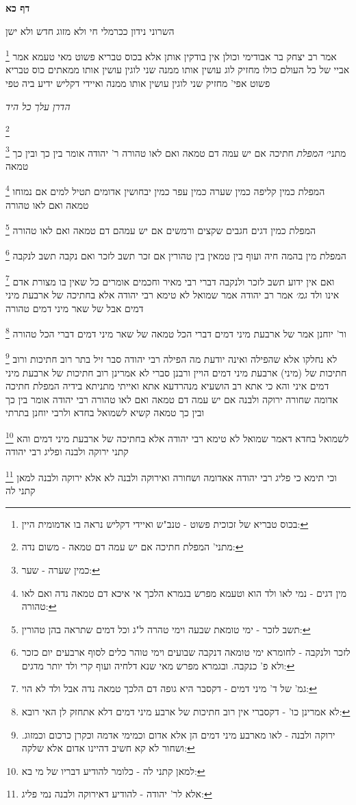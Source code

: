 \documentclass[12pt, openany]{book}
\newcommand{\sethebfont}{
\fontsize{10.5pt}{21.0pt} \selectfont
}
\newcommand{\twocol}[1]{
	{\sethebfont \begin{multicols}{2}
			#1
	\end{multicols}}	
}
\newcommand{\sectname}{}
\newcommand{\newsection}[1]{
	\addcontentsline{toc}{section}{#1}
	\renewcommand{\sectname}{#1}	
	\vspace{-\baselineskip}
	\begin{center}
		\textbf{%
\fontsize{16pt}{16pt}\selectfont
			#1}
	\end{center}
	\vspace{-\baselineskip}
	\nopagebreak
}
\newcommand{\footnotecomment}[1]{
	\renewcommand\thefootnote{}
	\footnote{#1}}
\newcommand{\commenta}[1]{\footnotecomment{#1}}
\begin{document}
\newsection{דף כא}
\twocol{השרוני נידון ככרמלי חי ולא מזוג חדש ולא ישן 
\commenta{בכוס טבריא של זכוכית פשוט - טנב"ש ואיידי דקליש נראה בו אדמומית היין:}
אמר רב יצחק בר אבודימי וכולן אין בודקין אותן אלא בכוס טבריא פשוט מאי טעמא אמר אביי של כל העולם כולו מחזיק לוג עושין אותו ממנה שני לוגין עושין אותו ממאתים כוס טבריא פשוט אפי' מחזיק שני לוגין עושין אותו ממנה ואיידי דקליש ידיע ביה טפי
\par \par {\large\emph{הדרן עלך כל היד}}\par \par 
\commenta{מתני' המפלת חתיכה אם יש עמה דם טמאה - משום נדה:}

\commenta{כמין שערה - שער:}
מתני׳ {\large\emph{המפלת}} חתיכה אם יש עמה דם טמאה ואם לאו טהורה ר' יהודה אומר בין כך ובין כך טמאה 
\commenta{מין דגים - נמי לאו ולד הוא וטעמא מפרש בגמרא הלכך אי איכא דם טמאה נדה ואם לאו טהורה:}
המפלת כמין קליפה כמין שערה כמין עפר כמין יבחושין אדומים תטיל למים אם נמוחו טמאה ואם לאו טהורה 
\commenta{תשב לזכר - ימי טומאת שבעה וימי טהרה ל"ג וכל דמים שתראה בהן טהורין:}
המפלת כמין דגים חגבים שקצים ורמשים אם יש עמהם דם טמאה ואם לאו טהורה 
\commenta{לזכר ולנקבה - לחומרא ימי טומאה דנקבה שבועים וימי טוהר כלים לסוף ארבעים יום כזכר ולא פ' כנקבה. ובגמרא מפרש מאי שנא דלחיה ועוף קרי ולד יותר מדגים:}
המפלת מין בהמה חיה ועוף בין טמאין בין טהורין אם זכר תשב לזכר ואם נקבה תשב לנקבה
\commenta{גמ' של ד' מיני דמים - דקסבר היא גופה דם הלכך טמאה נדה אבל ולד לא הוי:}
ואם אין ידוע תשב לזכר ולנקבה דברי רבי מאיר וחכמים אומרים כל שאין בו מצורת אדם אינו ולד
{\large\emph{גמ׳}} אמר רב יהודה אמר שמואל לא טימא רבי יהודה אלא בחתיכה של ארבעת מיני דמים אבל של שאר מיני דמים טהורה 
\commenta{לא אמרינן כו' - דקסברי אין רוב חתיכות של ארבע מיני דמים דלא אתחזק לן האי רובא:}
ור' יוחנן אמר של ארבעת מיני דמים דברי הכל טמאה של שאר מיני דמים דברי הכל טהורה 
\commenta{ירוקה ולבנה - לאו מארבע מיני דמים הן אלא אדום וכמימי אדמה וכקרן כרכום וכמזוג. ושחור לא קא חשיב דהיינו אדום אלא שלקה:}
לא נחלקו אלא שהפילה ואינה יודעת מה הפילה רבי יהודה סבר זיל בתר רוב חתיכות ורוב חתיכות של (מיני) ארבעת מיני דמים הויין ורבנן סברי לא אמרינן רוב חתיכות של ארבעת מיני דמים 
איני והא כי אתא רב הושעיא מנהרדעא אתא ואייתי מתניתא בידיה המפלת חתיכה אדומה שחורה ירוקה ולבנה אם יש עמה דם טמאה ואם לאו טהורה רבי יהודה אומר בין כך ובין כך טמאה קשיא לשמואל בחדא ולרבי יוחנן בתרתי 
\commenta{למאן קתני לה - כלומר להודיע דבריו של מי בא:}
לשמואל בחדא דאמר שמואל לא טימא רבי יהודה אלא בחתיכה של ארבעת מיני דמים והא קתני ירוקה ולבנה ופליג רבי יהודה 
\commenta{אלא לר' יהודה - להודיע דאירוקה ולבנה נמי פליג:}
וכי תימא כי פליג רבי יהודה אאדומה ושחורה ואירוקה ולבנה לא אלא ירוקה ולבנה למאן קתני לה 
}
\end{document}
